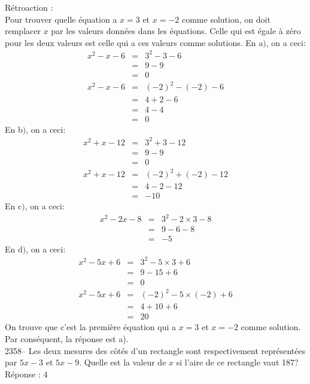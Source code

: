 \documentclass[letterpaper, 12pt]{article}
\begin{document}
R\'etroaction :\\
Pour trouver quelle \'equation a $x=3$ et $x=-2$ comme solution, on doit remplacer $x$ par les valeurs donn\'ees dans les \'equations. Celle qui est \'egale \`a z\'ero pour les deux valeurs est celle qui a ces valeurs comme solutions.
En a$)$, on a ceci:
\begin{eqnarray*}
 x^{2}-x-6&=&3^{2}-3-6\\
&=&9-9\\
&=&0\\
 x^{2}-x-6&=&(-2)^{2}-(-2)-6\\
&=&4+2-6\\
&=&4-4\\
&=&0
\end{eqnarray*}
En b$)$, on a ceci:
\begin{eqnarray*}
 x^{2}+x-12&=&3^{2}+3-12\\
&=&9-9\\
&=&0\\
 x^{2}+x-12&=&(-2)^{2}+(-2)-12\\
&=&4-2-12\\
&=&-10
\end{eqnarray*}
En c$)$, on a ceci:
\begin{eqnarray*}
 x^{2}-2x-8&=&3^{2}-2\times3-8\\
&=&9-6-8\\
&=&-5
\end{eqnarray*}
En d$)$, on a ceci:
\begin{eqnarray*}
 x^{2}-5x+6&=&3^{2}-5\times 3+6\\
&=&9-15+6\\
&=&0\\
 x^{2}-5x+6&=&(-2)^{2}-5\times(-2)+6\\
&=&4+10+6\\
&=&20
\end{eqnarray*}
On trouve que c'est la premi\`ere \'equation qui a $x=3$ et $x=-2$ comme solution.\\
Par cons\'equent, la r\'eponse est a).\\

2358-- Les deux mesures des c\^ot\'es d'un rectangle sont respectivement repr\'esent\'ees par $5x-3$ et $5x-9$. Quelle est la valeur de $x$ si l'aire de ce rectangle vaut 187?\\

R\'eponse : 4\\
\end{document}
